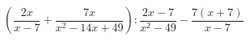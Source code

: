 \begin{ex}[type=expression]
	\begin{condition}
		\( \left( \dfrac{2x}{x-7}+ \dfrac{7x}{x^2-14x+49}\right) :\dfrac{2x-7}{x^2-49}-\dfrac{7(x+7)}{x-7}\)
	\end{condition}
\end{ex}